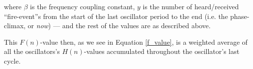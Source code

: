 		where $\beta$ is the frequency coupling constant, $y$ is the number of heard/received ``fire-event''s from the start of the last oscillator period to the end (i.e. the phase-climax, or \textit{now}) — and the rest of the values are as described above.

		This $F(n)$-value then, as we see in Equation \eqref{f_value}, is a weighted average of all the oscillators's $H(n)$-values accumulated throughout the oscillator's last cycle.

